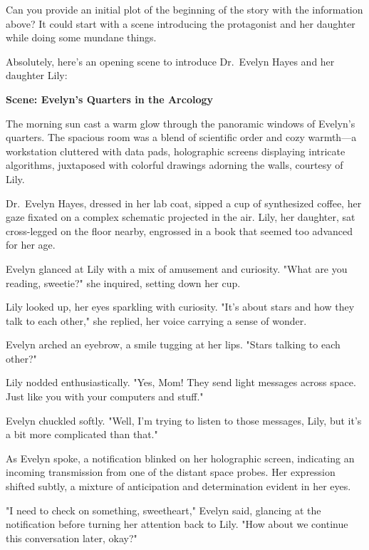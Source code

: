 \begin{qquote}
    Can you provide an initial plot of the beginning of the story with the information above? It could start with a scene introducing the protagonist and her daughter while doing some mundane things.
\end{qquote}

\begin{aquote}
    Absolutely, here's an opening scene to introduce Dr.~Evelyn Hayes and her daughter Lily:\medskip

    \noindent\textbf{Scene: Evelyn's Quarters in the Arcology}

    The morning sun cast a warm glow through the panoramic windows of Evelyn's quarters. The spacious room was a blend of scientific order and cozy warmth—a workstation cluttered with data pads, holographic screens displaying intricate algorithms, juxtaposed with colorful drawings adorning the walls, courtesy of Lily.

    Dr.~Evelyn Hayes, dressed in her lab coat, sipped a cup of synthesized coffee, her gaze fixated on a complex schematic projected in the air. Lily, her daughter, sat cross-legged on the floor nearby, engrossed in a book that seemed too advanced for her age.

    Evelyn glanced at Lily with a mix of amusement and curiosity. "What are you reading, sweetie?" she inquired, setting down her cup.

    Lily looked up, her eyes sparkling with curiosity. "It's about stars and how they talk to each other," she replied, her voice carrying a sense of wonder.

    Evelyn arched an eyebrow, a smile tugging at her lips. "Stars talking to each other?"

    Lily nodded enthusiastically. "Yes, Mom! They send light messages across space. Just like you with your computers and stuff."

    Evelyn chuckled softly. "Well, I'm trying to listen to those messages, Lily, but it's a bit more complicated than that."

    As Evelyn spoke, a notification blinked on her holographic screen, indicating an incoming transmission from one of the distant space probes. Her expression shifted subtly, a mixture of anticipation and determination evident in her eyes.

    "I need to check on something, sweetheart," Evelyn said, glancing at the notification before turning her attention back to Lily. "How about we continue this conversation later, okay?"


\end{aquote}
